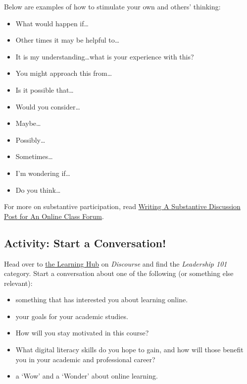 \documentclass[
]{book}
\providecommand{\tightlist}{%
  \setlength{\itemsep}{0pt}\setlength{\parskip}{0pt}}
\theoremstyle{definition}
\theoremstyle{definition}
\theoremstyle{definition}
\theoremstyle{definition}
\theoremstyle{remark}
\begin{document}
Below are examples of how to stimulate your own and others' thinking:

\begin{itemize}
\tightlist
\item
  What would happen if\ldots{}
\item
  Other times it may be helpful to\ldots{}\\
\item
  It is my understanding\ldots what is your experience with this?\\
\item
  You might approach this from\ldots{}\\
\item
  Is it possible that\ldots{}\\
\item
  Would you consider\ldots{}\\
\item
  Maybe\ldots{}\\
\item
  Possibly\ldots{}\\
\item
  Sometimes\ldots{}\\
\item
  I'm wondering if\ldots{}\\
\item
  Do you think\ldots{}
\end{itemize}

For more on substantive participation, read \href{https://apuedge.com/writing-a-substantive-discussion-post-for-an-online-class-forum/}{Writing A Substantive Discussion Post for An Online Class Forum}.

\hypertarget{activity-start-a-conversation}{%
\subsection*{Activity: Start a Conversation!}\label{activity-start-a-conversation}}

\begin{reflect}
Head over to \href{https://twu.discourse.group}{the Learning Hub} on \emph{Discourse} and find the \emph{Leadership 101} category. Start a conversation about one of the following (or something else relevant):

\begin{itemize}
\tightlist
\item
  something that has interested you about learning online.\\
\item
  your goals for your academic studies.\\
\item
  How will you stay motivated in this course?\\
\item
  What digital literacy skills do you hope to gain, and how will those benefit you in your academic and professional career?
\item
  a `Wow' and a `Wonder' about online learning.
\end{itemize}
\end{reflect}
\end{document}
